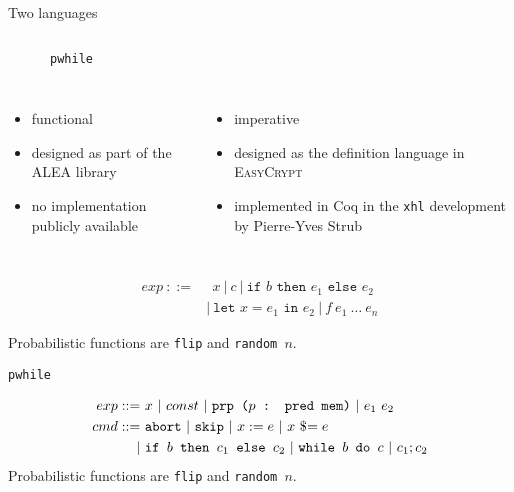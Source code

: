 \documentclass{beamer}
\begin{document}
\begin{frame}{Two languages}
  \begin{columns}
    \LARGE{\rml}\tiny{\cite{rml-paper}}
    \hrule
    \LARGE{\texttt{pwhile}}\tiny{\cite{easy-crypt}}
    \vspace{-0.5em}
    \hrule
  \end{columns}
  \pause
  \begin{columns}
    \begin{itemize}
        \item functional
        \item designed as part of the ALEA library
        \item no implementation publicly available
    \end{itemize}
    \pause
    \begin{itemize}
        \item imperative
        \item designed as the definition language in \textsc{EasyCrypt}
        \item implemented in Coq in the \texttt{xhl} development by Pierre-Yves
      Strub
    \end{itemize}
  \end{columns}
\end{frame}


\begin{frame}{\rml}
  
\begin{align*}
  exp~::=&~ ~ x~\vert ~ c~\vert ~ \texttt{if }b\texttt{ then }e_1\texttt{ else } e_2~\\
  &\vert ~ \texttt{let }x = e_1 \texttt{ in }e_2~\vert ~ f~e_1~\dots~e_n
\end{align*}

Probabilistic functions are \texttt{flip} and \texttt{random $n$}. 
\end{frame}


\begin{frame}{\texttt{pwhile}}
  
\begin{align*}
  exp ::=~& x ~\vert ~ const ~\vert ~ \texttt{prp ($p$ : pred mem)}~\vert ~ e_1\ e_2\\
  cmd ::=~& \texttt{abort} ~\vert ~ \texttt{skip} ~\vert ~ x := e ~\vert ~ x\ \$\hspace{-0.25em}= e\\
  \vert ~ & \texttt{if } b \texttt{ then } c_1 \texttt{ else } c_2 ~\vert ~
            \texttt{while } b \texttt{ do } c ~\vert ~ c_1 ; c_2
\end{align*}
Probabilistic functions are \texttt{flip} and \texttt{random $n$}. 
\end{frame}
\end{document}
